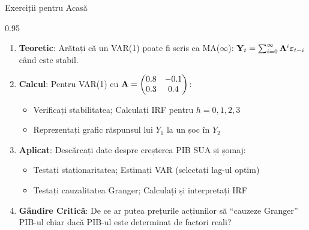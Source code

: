 \documentclass[9pt, aspectratio=169, t]{beamer}
\begin{document}
\begin{frame}{Exerciții pentru Acasă}
    \begin{cminipage}{0.95\textwidth}
    {\footnotesize
    \begin{enumerate}\setlength{\itemsep}{2pt}
        \item \textbf{Teoretic}: Arătați că un VAR(1) poate fi scris ca MA($\infty$): $\mathbf{Y}_t = \sum_{i=0}^{\infty} \mathbf{A}^i \boldsymbol{\varepsilon}_{t-i}$ când este stabil.

        \item \textbf{Calcul}: Pentru VAR(1) cu $\mathbf{A} = \begin{pmatrix} 0.8 & -0.1 \\ 0.3 & 0.4 \end{pmatrix}$:
            \begin{itemize}\setlength{\itemsep}{0pt}
                \item Verificați stabilitatea; Calculați IRF pentru $h = 0, 1, 2, 3$
                \item Reprezentați grafic răspunsul lui $Y_1$ la un șoc în $Y_2$
            \end{itemize}

        \item \textbf{Aplicat}: Descărcați date despre creșterea PIB SUA și șomaj:
            \begin{itemize}\setlength{\itemsep}{0pt}
                \item Testați staționaritatea; Estimați VAR (selectați lag-ul optim)
                \item Testați cauzalitatea Granger; Calculați și interpretați IRF
            \end{itemize}

        \item \textbf{Gândire Critică}: De ce ar putea prețurile acțiunilor să ``cauzeze Granger'' PIB-ul chiar dacă PIB-ul este determinat de factori reali?
    \end{enumerate}
    }
    \end{cminipage}
\end{frame}
\end{document}
